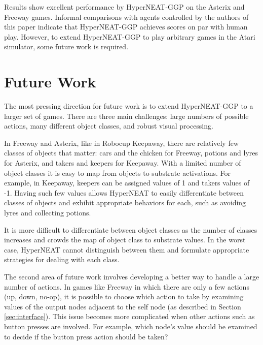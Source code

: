 \documentclass{sig-alternate}
\begin{document}
Results show excellent performance by HyperNEAT-GGP on the Asterix and Freeway games. Informal comparisons with agents controlled by the authors of this paper indicate that HyperNEAT-GGP achieves scores on par with human play. However, to extend HyperNEAT-GGP to play arbitrary games in the Atari simulator, some future work is required.

\section{Future Work}
\label{sec:futurework}
The most pressing direction for future work is to extend HyperNEAT-GGP to a larger set of games. There are three main challenges: large numbers of possible actions, many different object classes, and robust visual processing.

In Freeway and Asterix, like in Robocup Keepaway, there are relatively few classes of objects that matter: cars and the chicken for Freeway, potions and lyres for Asterix, and takers and keepers for Keepaway. With a limited number of object classes it is easy to map from objects to substrate activations. For example, in Keepaway, keepers can be assigned values of 1 and takers values of -1. Having such few values allows HyperNEAT to easily differentiate between classes of objects and exhibit appropriate behaviors for each, such as avoiding lyres and collecting potions.

It is more difficult to differentiate between object classes as the number of classes increases and crowds the map of object class to substrate values. In the worst case, HyperNEAT cannot distinguish between them and formulate appropriate strategies for dealing with each class.


The second area of future work involves developing a better way to handle a large number of actions. In games like Freeway in which there are only a few actions (up, down, no-op), it is possible to choose which action to take by examining values of the output nodes adjacent to the self node (as described in Section \ref{sec:interface}). This issue becomes more complicated when other actions such as button presses are involved. For example, which node's value should be examined to decide if the button press action should be taken? 
\end{document}
